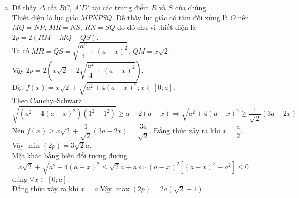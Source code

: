 \begin{ex}
{\begin{enumerate}[a)]
			Gọi $\Delta $ là đường thẳng qua  $O$ và song song với $A'B$ thì $\Delta $ cố định và $\Delta \subset (MNPQ)$. Hay $(MNPQ)$ luôn chứa đường thẳng cố định $\Delta $.\\
			$(MNPQ)\parallel (A'BC')\Rightarrow  BC'\parallel (MNPQ)\Rightarrow BC'\parallel NR$
			$\Leftrightarrow \dfrac{BR}{BC}=\dfrac{C'N}{CC'}\Rightarrow x=\dfrac{a}{2}$. Đảo lại $x=\dfrac{a}{2}$, dễ dàng  chứng minh được $(MNPQ)\parallel (A'BC')$.
			\item Dễ thấy $\Delta $ cắt $BC$,  $A'D'$ tại các trung điểm $R$ và $S$ của chúng.\\
			Thiết diện là lục giác $MPNPSQ$. Dễ thấy lục giác có tâm đối xứng  là $O$ nên $MQ=NP$, $MR=NS$, $RN=SQ$ do đó chu vi thiết diện là
			$2p=2\left(RM+MQ+QS\right)$.\\ 
			 Ta có $MR=QS=\sqrt{\dfrac{a^2}{4}+\left(a-x\right)^2}$, $QM=x\sqrt{2}$.\\
			Vậy $2p=2\left(x\sqrt{2}+2\sqrt{\dfrac{a^2}{4}+\left(a-x\right)^2}\right)$.\\ 
			Đặt $f(x)=x\sqrt{2}+\sqrt{a^2+4\left(a-x\right)^2};x\in [0;a]$.\\ 
			Theo Cauchy--Schwarz 
			\[\sqrt{\left(a^2+4\left(a-x\right)^2\right)\left(1^2+1^2\right)}\ge a+2\left(a-x\right)\Rightarrow \sqrt{a^2+4\left(a-x\right)^2}\ge  \dfrac{1}{\sqrt{2}}\left(3a-2x\right)\]
			Nên $f(x)\ge x\sqrt{2}+\dfrac{1}{\sqrt{2}}\left(3a-2x\right)=\dfrac{3a}{\sqrt{2}}$. Đẳng thức xảy ra khi  $x=\dfrac{a}{2}$.\\
			Vậy  $\min \left(2p\right)=3\sqrt{2}a$.\\
			Mặt khác bằng biến đổi  tương đương
			\[x\sqrt{2}+\sqrt{a^2+4\left(a-x\right)^2}\le \sqrt{2}a+a\Leftrightarrow{\left(a-x\right)^2}\left[\left(a-x\right)^2-a^2\right]\le  0\]
			đúng  $\forall x\in \left[0;a\right]$.\\
			Đẳng thức xảy ra khi $x=a$.Vậy $\max \left(2p\right)=2a\left(\sqrt{2}+1\right)$. 
		\end{enumerate}
	 }
\end{ex}

